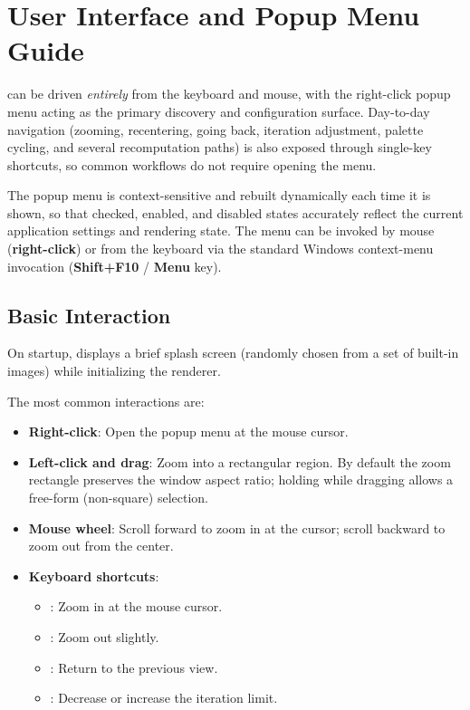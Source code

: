 \section{User Interface and Popup Menu Guide}
\label{sec:ui-popup-menu}

\FractalShark{} can be driven \emph{entirely} from the keyboard and mouse, with the
right-click popup menu acting as the primary discovery and configuration
surface.  Day-to-day navigation (zooming, recentering, going back, iteration
adjustment, palette cycling, and several recomputation paths) is also exposed
through single-key shortcuts, so common workflows do not require opening the
menu.

The popup menu is context-sensitive and rebuilt dynamically each time it is
shown, so that checked, enabled, and disabled states accurately reflect the
current application settings and rendering state.  The menu can be invoked by
mouse (\textbf{right-click}) or from the keyboard via the standard Windows
context-menu invocation (\textbf{Shift+F10} / \textbf{Menu} key).

\subsection{Basic Interaction}

On startup, \FractalShark{} displays a brief splash screen (randomly chosen
from a set of built-in images) while initializing the renderer.

The most common interactions are:
\begin{itemize}
  \item \textbf{Right-click}: Open the popup menu at the mouse cursor.
  \item \textbf{Left-click and drag}: Zoom into a rectangular region.
        By default the zoom rectangle preserves the window aspect ratio;
        holding  while dragging allows a free-form
        (non-square) selection.
  \item \textbf{Mouse wheel}: Scroll forward to zoom in at the cursor;
        scroll backward to zoom out from the center.
  \item \textbf{Keyboard shortcuts}:
    \begin{itemize}
      \item {}: Zoom in at the mouse cursor.
      \item {}: Zoom out slightly.
      \item {}: Return to the previous view.
      \item \code{- / =}: Decrease or increase the iteration limit.
    \end{itemize}
\end{itemize}

